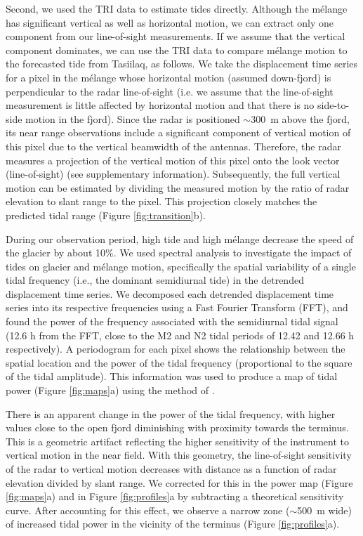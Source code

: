 Second, we used the TRI data to estimate tides directly. Although the m\'elange has significant vertical as well as horizontal motion, we can extract only one component from our line-of-sight measurements.  If we assume that the vertical component dominates, we can use the TRI data to compare m\'elange motion to the forecasted tide from Tasiilaq, as follows. We take the displacement time series for a pixel in the m\'elange whose horizontal motion (assumed down-fjord) is perpendicular to the radar line-of-sight (i.e. we assume that the line-of-sight measurement is little affected by horizontal motion and that there is no side-to-side motion in the fjord).  Since the radar is positioned $\sim$300~m above the fjord, its near range observations include a significant component of vertical motion of this pixel due to the vertical beamwidth of the antennas. Therefore, the radar measures a projection of the vertical motion of this pixel onto the look vector (line-of-sight) (see supplementary information).  Subsequently, the full vertical motion can be estimated by dividing the measured motion by the ratio of radar elevation to slant range to the pixel. This projection closely matches the predicted tidal range (Figure \ref{fig:transition}b). 


During our observation period, high tide and high m\'elange decrease the speed of the glacier by about 10\%.  We used spectral analysis to investigate the impact of tides on glacier and m\'elange motion, specifically the spatial variability of a single tidal frequency (i.e., the dominant semidiurnal tide) in the detrended displacement time series. We decomposed each detrended displacement time series into its respective frequencies using a Fast Fourier Transform (FFT), and found the power of the frequency associated with the semidiurnal tidal signal (12.6 h from the FFT, close to the M2 and N2 tidal periods of 12.42 and 12.66 h respectively). A periodogram for each pixel shows the relationship between the spatial location and the power of the tidal frequency (proportional to the square of the tidal amplitude). This information was used to produce a map of tidal power (Figure \ref{fig:maps}a) using the method of \citet{glover2011modeling}. 

There is an apparent change in the power of the tidal frequency, with higher values close to the open fjord diminishing with proximity towards the terminus. This is a geometric artifact reflecting the higher sensitivity of the instrument to vertical motion in the near field.  With this geometry, the line-of-sight sensitivity of the radar to vertical motion decreases with distance as a function of radar elevation divided by slant range. We corrected for this in the power map (Figure \ref{fig:maps}a) and in Figure \ref{fig:profiles}a by subtracting a theoretical sensitivity curve. After accounting for this effect, we observe a narrow zone ($\sim$500~m wide) of increased tidal power in the vicinity of the terminus (Figure \ref{fig:profiles}a).


